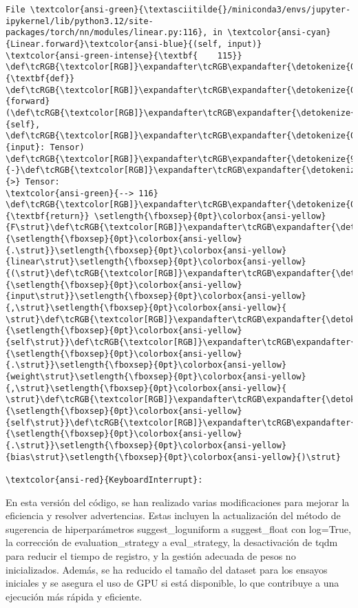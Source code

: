 \documentclass[11pt]{article}
\begin{document}
\begin{Verbatim}[commandchars=\\\{\}, frame=single, framerule=2mm, rulecolor=\color{outerrorbackground}]
File \textcolor{ansi-green}{\textasciitilde{}/miniconda3/envs/jupyter-ipykernel/lib/python3.12/site-packages/torch/nn/modules/linear.py:116}, in \textcolor{ansi-cyan}{Linear.forward}\textcolor{ansi-blue}{(self, input)}
\textcolor{ansi-green-intense}{\textbf{    115}} \def\tcRGB{\textcolor[RGB]}\expandafter\tcRGB\expandafter{\detokenize{0,135,0}}{\textbf{def}} \def\tcRGB{\textcolor[RGB]}\expandafter\tcRGB\expandafter{\detokenize{0,0,255}}{forward}(\def\tcRGB{\textcolor[RGB]}\expandafter\tcRGB\expandafter{\detokenize{0,135,0}}{self}, \def\tcRGB{\textcolor[RGB]}\expandafter\tcRGB\expandafter{\detokenize{0,135,0}}{input}: Tensor) \def\tcRGB{\textcolor[RGB]}\expandafter\tcRGB\expandafter{\detokenize{98,98,98}}{-}\def\tcRGB{\textcolor[RGB]}\expandafter\tcRGB\expandafter{\detokenize{98,98,98}}{>} Tensor:
\textcolor{ansi-green}{--> 116}     \def\tcRGB{\textcolor[RGB]}\expandafter\tcRGB\expandafter{\detokenize{0,135,0}}{\textbf{return}} \setlength{\fboxsep}{0pt}\colorbox{ansi-yellow}{F\strut}\def\tcRGB{\textcolor[RGB]}\expandafter\tcRGB\expandafter{\detokenize{98,98,98}}{\setlength{\fboxsep}{0pt}\colorbox{ansi-yellow}{.\strut}}\setlength{\fboxsep}{0pt}\colorbox{ansi-yellow}{linear\strut}\setlength{\fboxsep}{0pt}\colorbox{ansi-yellow}{(\strut}\def\tcRGB{\textcolor[RGB]}\expandafter\tcRGB\expandafter{\detokenize{0,135,0}}{\setlength{\fboxsep}{0pt}\colorbox{ansi-yellow}{input\strut}}\setlength{\fboxsep}{0pt}\colorbox{ansi-yellow}{,\strut}\setlength{\fboxsep}{0pt}\colorbox{ansi-yellow}{ \strut}\def\tcRGB{\textcolor[RGB]}\expandafter\tcRGB\expandafter{\detokenize{0,135,0}}{\setlength{\fboxsep}{0pt}\colorbox{ansi-yellow}{self\strut}}\def\tcRGB{\textcolor[RGB]}\expandafter\tcRGB\expandafter{\detokenize{98,98,98}}{\setlength{\fboxsep}{0pt}\colorbox{ansi-yellow}{.\strut}}\setlength{\fboxsep}{0pt}\colorbox{ansi-yellow}{weight\strut}\setlength{\fboxsep}{0pt}\colorbox{ansi-yellow}{,\strut}\setlength{\fboxsep}{0pt}\colorbox{ansi-yellow}{ \strut}\def\tcRGB{\textcolor[RGB]}\expandafter\tcRGB\expandafter{\detokenize{0,135,0}}{\setlength{\fboxsep}{0pt}\colorbox{ansi-yellow}{self\strut}}\def\tcRGB{\textcolor[RGB]}\expandafter\tcRGB\expandafter{\detokenize{98,98,98}}{\setlength{\fboxsep}{0pt}\colorbox{ansi-yellow}{.\strut}}\setlength{\fboxsep}{0pt}\colorbox{ansi-yellow}{bias\strut}\setlength{\fboxsep}{0pt}\colorbox{ansi-yellow}{)\strut}

\textcolor{ansi-red}{KeyboardInterrupt}: 
    \end{Verbatim}

    En esta versión del código, se han realizado varias modificaciones para
mejorar la eficiencia y resolver advertencias. Estas incluyen la
actualización del método de sugerencia de hiperparámetros
suggest\_loguniform a suggest\_float con log=True, la corrección de
evaluation\_strategy a eval\_strategy, la desactivación de tqdm para
reducir el tiempo de registro, y la gestión adecuada de pesos no
inicializados. Además, se ha reducido el tamaño del dataset para los
ensayos iniciales y se asegura el uso de GPU si está disponible, lo que
contribuye a una ejecución más rápida y eficiente.
\end{document}
